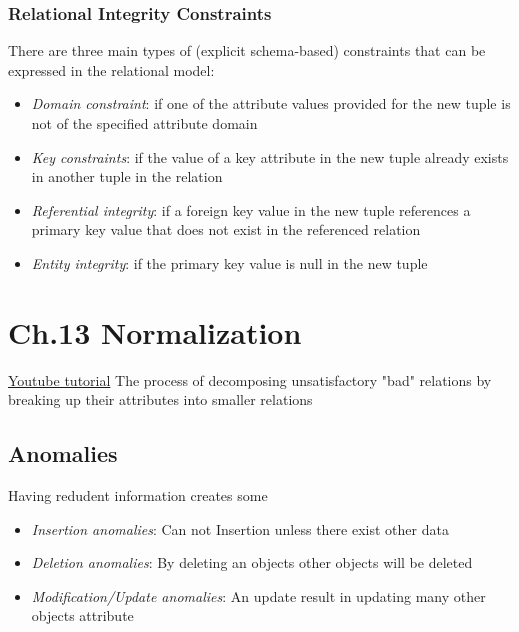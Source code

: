 \subsubsection{Relational Integrity Constraints}
There are three main types of (explicit schema-based) 
constraints that can be expressed in the relational model:
\begin{itemize}
    \item \textit{Domain constraint}: \newline if one of the attribute values provided for the new tuple is not of the specified attribute domain
    \item \textit{Key constraints}: \newline if the value of a key attribute in the new tuple already exists in another tuple in the relation
    \item \textit{Referential integrity}: \newline if a foreign key value in the new tuple references a primary key value that does not exist in the referenced relation
    \item \textit{Entity integrity}: \newline if the primary key value is null in the new tuple
\end{itemize}

\newpage
\section{Ch.13 Normalization}
\href{https://www.youtube.com/watch?v=xoTyrdT9SZI}{Youtube tutorial}
The process of decomposing unsatisfactory "bad"
relations by breaking up their attributes into
smaller relations


\subsection{Anomalies}
Having redudent information creates some 
\begin{itemize}
    \item \textit{Insertion anomalies}: Can not Insertion unless there exist other data
    \item \textit{Deletion anomalies}: By deleting an objects other objects will be deleted 
    \item \textit{Modification/Update anomalies}: An update result in updating many other objects attribute
\end{itemize}

